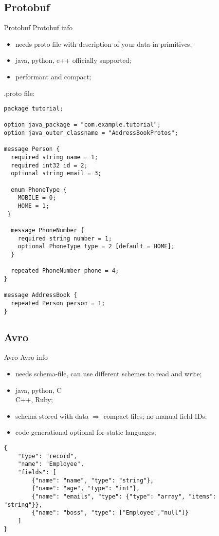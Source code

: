 \documentclass[8pt]{beamer}
\begin{document}
\renewcommand{\partname}{Protobuf}
\subsection{\partname}
\begin{frame}[fragile]{\partname}
  Protobuf info
  \begin{itemize}
    \item needs proto-file with description of your data in primitives;
    \item java, python, c++ officially supported;
    \item performant and compact;
  \end{itemize}

.proto file:
\begin{verbatim}
package tutorial;

option java_package = "com.example.tutorial";
option java_outer_classname = "AddressBookProtos";

message Person {
  required string name = 1;
  required int32 id = 2;
  optional string email = 3;

  enum PhoneType {
    MOBILE = 0;
    HOME = 1;
 }

  message PhoneNumber {
    required string number = 1;
    optional PhoneType type = 2 [default = HOME];
  }

  repeated PhoneNumber phone = 4;
}

message AddressBook {
  repeated Person person = 1;
}

\end{verbatim}

\end{frame}

\renewcommand{\partname}{Avro}
\subsection{\partname}
\begin{frame}[fragile]{\partname}
  Avro info
  \begin{itemize}
    \item needs schema-file, can use different schemes to read and write;
    \item java, python, C\\C++, Ruby;
    \item schema stored with data $\Rightarrow$ compact files; no manual
    field-IDs;
    \item code-generational optional for static languages;
  \end{itemize}

  \begin{verbatim}
{
    "type": "record",
    "name": "Employee",
    "fields": [
        {"name": "name", "type": "string"},
        {"name": "age", "type": "int"},
        {"name": "emails", "type": {"type": "array", "items": "string"}},
        {"name": "boss", "type": ["Employee","null"]}
    ]
}
  \end{verbatim}

\end{frame}
\end{document}
